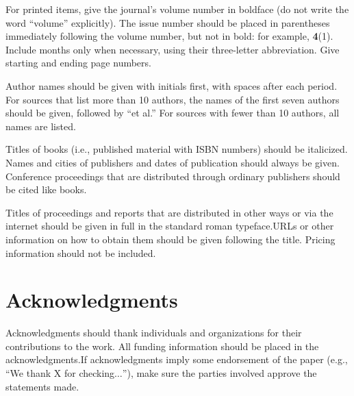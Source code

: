 \documentclass{article}
\begin{document}
For printed items, give the journal{'}s volume number in boldface (do not write the word {``}volume{''} explicitly). The issue number should be placed in parentheses immediately following the volume number, but not in bold: for example, \textbf{4}(1). Include months only when necessary, using their three-letter abbreviation. Give starting and ending page numbers.

Author names should be given with initials first, with spaces after each period. For sources that list more than 10 authors, the names of the first seven authors should be given, followed by {``}et al.{''} For sources with fewer than 10 authors, all names are listed.

Titles of books (i.e., published material with ISBN numbers) should be italicized. Names and cities of publishers and dates of publication should always be given. Conference proceedings that are distributed through ordinary publishers should be cited like books. 

Titles of proceedings and reports that are distributed in other ways or via the internet should be given in full in the standard roman typeface.URLs or other information on how to obtain them should be given following the title. Pricing information should not be included.

\section*{Acknowledgments}

Acknowledgments should thank individuals and organizations for their contributions to the work. All funding information should be placed in the acknowledgments.If acknowledgments imply some endorsement of the paper (e.g., {``}We thank X for checking\(\ldots\){''}), make sure the parties involved approve the statements made.
\end{document}
